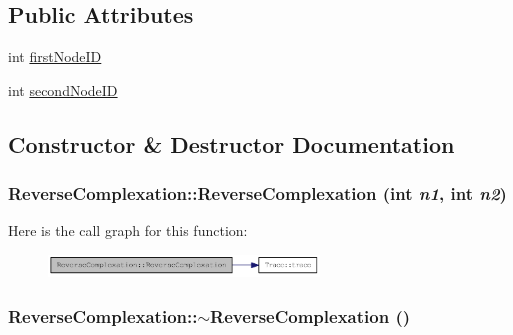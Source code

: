 \subsection*{Public Attributes}
\begin{DoxyCompactItemize}
\item 
int \hyperlink{classReverseComplexation_aa9ed054c37191c54e372b941eb49478f}{firstNodeID}
\item 
int \hyperlink{classReverseComplexation_a2d42a108e3fce695be1b9867e4f16ec4}{secondNodeID}
\end{DoxyCompactItemize}


\subsection{Constructor \& Destructor Documentation}
\hypertarget{classReverseComplexation_a12c42d3947dcd67f5cff0e9dd218a4c6}{
\subsubsection[{ReverseComplexation}]{\setlength{\rightskip}{0pt plus 5cm}ReverseComplexation::ReverseComplexation (int {\em n1}, \/  int {\em n2})}}
\label{classReverseComplexation_a12c42d3947dcd67f5cff0e9dd218a4c6}


Here is the call graph for this function:\nopagebreak
\begin{figure}[H]
\begin{center}
\leavevmode
\includegraphics[width=204pt]{classReverseComplexation_a12c42d3947dcd67f5cff0e9dd218a4c6_cgraph}
\end{center}
\end{figure}
\hypertarget{classReverseComplexation_a8f2824bf550b11d11dd51db704534473}{
\subsubsection[{$\sim$ReverseComplexation}]{\setlength{\rightskip}{0pt plus 5cm}ReverseComplexation::$\sim$ReverseComplexation ()}}
\label{classReverseComplexation_a8f2824bf550b11d11dd51db704534473}


